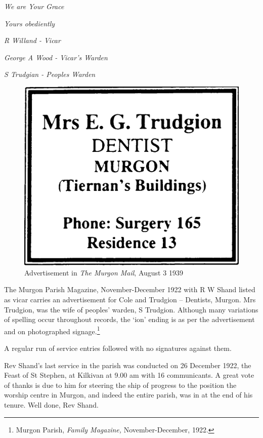 \emph{We are Your Grace}



\emph{Yours obediently}



\emph{R Willand - Vicar}



\emph{George A Wood - Vicar's Warden}



\emph{S Trudgian - Peoples Warden}



\medskip








\begin{figure}
\begin{center}
\includegraphics[width=.6\linewidth,center]{../images/trudgionAd.jpg}
\caption{Advertisement in \emph{The Murgon Mail}, August 3 1939}
\end{center}
\end{figure}




The Murgon Parish Magazine, November-December 1922 with R W Shand listed as vicar carries an advertisement for Cole and Trudgion -- Dentists, Murgon. Mrs Trudgion, was the wife of peoples' warden, S Trudgion. Although many variations of spelling occur throughout records, the `ion' ending is as per the advertisement and on photographed signage.\footnote{Murgon Parish, \emph{Family Magazine,} November-December, 1922.}


A regular run of service entries followed with no signatures against them.



Rev Shand's last service in the parish was conducted on 26 December 1922, the Feast of St Stephen, at Kilkivan at 9.00 am with 16 communicants. A great vote of thanks is due to him for steering the ship of progress to the position the worship centre in Murgon, and indeed the entire parish, was in at the end of his tenure. Well done, Rev Shand.



